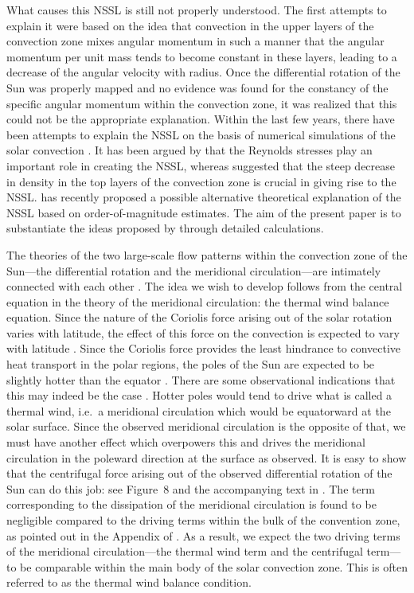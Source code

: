 What causes this NSSL is still not properly understood.  The first attempts to explain it \citep{Foukal1975, Gilman1979} were based on the idea that convection in the upper layers of the convection zone mixes angular momentum in such a manner that the angular momentum per unit mass tends to become constant in these layers, leading to a decrease of the angular velocity with radius.  Once the differential rotation of the Sun was properly mapped and no evidence was found for the constancy of the specific
angular momentum within the convection zone, it was realized that this
could not be the appropriate explanation. Within the last few years, there have been attempts to explain the NSSL on the basis of numerical simulations of the solar convection \citep{Guerrero2013, Hotta2015, Matilsky2019}. It has been argued by \citet{Hotta2015} that the Reynolds stresses play an important role in creating the NSSL, whereas \citet{Matilsky2019} suggested that the steep decrease in density in the top layers of the convection zone is crucial in giving rise to the NSSL. \citet{Choudhuri2021a} has recently proposed a possible alternative theoretical explanation of the NSSL based on order-of-magnitude estimates. The aim of the present paper is to substantiate the ideas proposed by \citet{Choudhuri2021a} through detailed calculations.

The theories of the two large-scale flow patterns within the convection zone of the Sun---the differential rotation and the meridional circulation---are intimately connected with each other \citep{Kitchatinov2013, Choudhuri2021b}.  The idea we wish to develop follows from the central equation in the theory of the meridional circulation: the thermal wind balance equation. Since the nature of the Coriolis force arising out of the solar rotation varies with latitude, the effect of this force on the convection is expected to vary with latitude \citep{Durney1971, Belvedere1976}. Since the Coriolis force provides the least hindrance to convective heat transport in the polar regions, the poles of the Sun are expected to be slightly hotter than the equator \citep{Kitchatinov1995}. There are some observational indications that this may indeed be the case  \citep{Kuhn1988, Rast2008}. Hotter poles would tend to drive what is called a thermal wind, i.e.\ a meridional circulation which would be equatorward at the solar surface. Since the observed meridional circulation is the opposite of that, we must have another effect which overpowers this and drives the meridional circulation in the poleward direction at the surface as observed. It is easy to show that the centrifugal force arising out of the observed differential rotation of the Sun can do this job: see Figure~8 and the accompanying text in \citet{Choudhuri2021b}. The term corresponding to the dissipation of the meridional circulation is found to be negligible compared to the driving terms within the bulk of the convention zone, as pointed out in the Appendix of \citet{Choudhuri2021b}.  As a result, we expect the two driving terms of the meridional circulation---the thermal wind term and the centrifugal term---to be comparable within the main body of the solar convection zone.  This is often referred to as the thermal wind balance condition.

